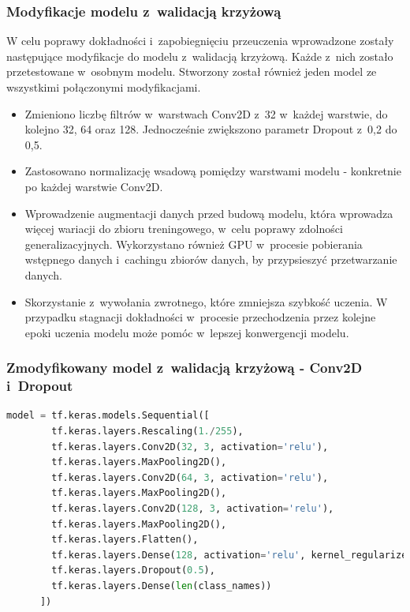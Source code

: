\subsubsection{Modyfikacje modelu z~walidacją krzyżową}

W celu poprawy dokładności i~zapobiegnięciu przeuczenia wprowadzone
zostały następujące modyfikacje do modelu z~walidacją krzyżową.
Każde z~nich zostało przetestowane w~osobnym modelu.
Stworzony został również jeden model ze wszystkimi połączonymi modyfikacjami. 
\begin{itemize}[label=-,labelsep=0.4cm,leftmargin=0.6cm]
    \item Zmieniono liczbę filtrów w~warstwach Conv2D z~32 w~każdej warstwie, do kolejno 32, 64 oraz 128.
		Jednocześnie zwiększono parametr Dropout z~0,2 do 0,5.
    \item Zastosowano normalizację wsadową pomiędzy warstwami modelu - konkretnie po każdej warstwie Conv2D.
    \item Wprowadzenie augmentacji danych przed budową modelu, która wprowadza więcej wariacji do zbioru treningowego,
		w~celu poprawy zdolności generalizacyjnych.
		Wykorzystano również GPU w~procesie pobierania wstępnego danych i~cachingu zbiorów danych, by przypsieszyć przetwarzanie danych.
	\item Skorzystanie z~wywołania zwrotnego, które zmniejsza szybkość uczenia.
		W przypadku stagnacji dokładności w~procesie przechodzenia przez kolejne epoki uczenia modelu
		może pomóc w~lepszej konwergencji modelu.
\end{itemize}

\clearpage

\subsubsection{Zmodyfikowany model z~walidacją krzyżową - Conv2D i~Dropout}

\begin{lstlisting}[language=Python,caption=Listing zmodyfikowanego skryptu tworzącego model z~walidacją krzyżową - wersja 1,
	label={tests-model-crossval1}]
	model = tf.keras.models.Sequential([
		tf.keras.layers.Rescaling(1./255),
		tf.keras.layers.Conv2D(32, 3, activation='relu'),
		tf.keras.layers.MaxPooling2D(),
		tf.keras.layers.Conv2D(64, 3, activation='relu'),
		tf.keras.layers.MaxPooling2D(),
		tf.keras.layers.Conv2D(128, 3, activation='relu'),
		tf.keras.layers.MaxPooling2D(),
		tf.keras.layers.Flatten(),
		tf.keras.layers.Dense(128, activation='relu', kernel_regularizer=tf.keras.regularizers.l2(0.01)),
		tf.keras.layers.Dropout(0.5),
		tf.keras.layers.Dense(len(class_names))
	  ])
\end{lstlisting}

